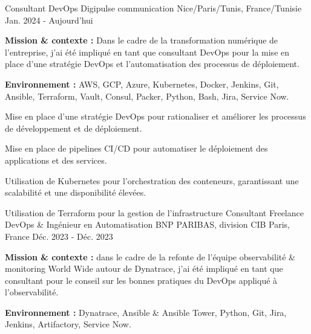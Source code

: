 
\begin{cventries}

\cventry
{Consultant DevOps} %
{Digipulse communication} %
{Nice/Paris/Tunis, France/Tunisie} %
{Jan. 2024 - Aujourd'hui} %
{
  \begin{cvitems} %
    \item {\textbf{Mission \& contexte :} Dans le cadre de la transformation numérique de l'entreprise, j'ai été impliqué en tant que consultant DevOps pour la mise en place d'une stratégie DevOps et l'automatisation des processus de déploiement.}
    \item {\textbf{Environnement :} AWS, GCP, Azure, Kubernetes, Docker, Jenkins, Git, Ansible, Terraform, Vault, Consul, Packer, Python, Bash, Jira, Service Now.}
    \item {Mise en place d'une stratégie DevOps pour rationaliser et améliorer les processus de développement et de déploiement.}
    \item {Mise en place de pipelines CI/CD pour automatiser le déploiement des applications et des services.}
    \item {Utilisation de Kubernetes pour l'orchestration des conteneurs, garantissant une scalabilité et une disponibilité élevées.}
    \item {Utilisation de Terraform pour la gestion de l'infrastructure
\cventry
{Consultant Freelance DevOps \& Ingénieur en Automatisation} %
{BNP PARIBAS, division CIB} %
{Paris, France} %
{Déc. 2023 - Déc. 2023} %
{
  \begin{cvitems}
    \item {\textbf{Mission \& contexte :} dans le cadre de la refonte de l'équipe observabilité \& monitoring World Wide autour de Dynatrace, j'ai été impliqué en tant que consultant pour le conseil sur les bonnes pratiques du DevOps appliqué à l'observabilité.}
    \item {\textbf{Environnement :} Dynatrace, Ansible \& Ansible Tower, Python, Git, Jira, Jenkins, Artifactory, Service Now.}

\end{cvitems}}}
\end{cvitems}}
\end{cventries}
